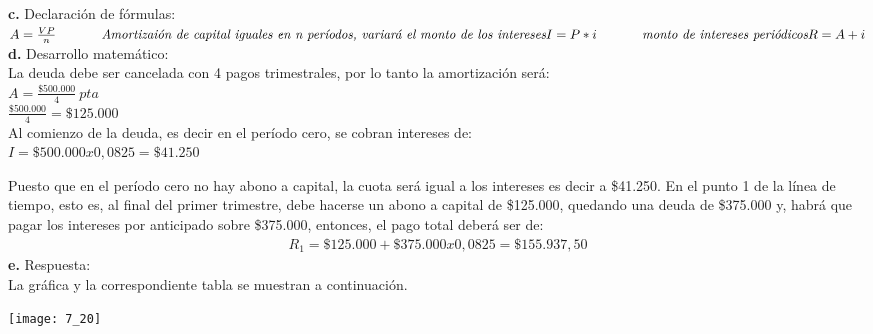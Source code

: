 \textbf{c.}	Declaración de fórmulas:\\


	$A=\frac{VP}{n} \hspace{35 pt} \textit{Amortizaión de capital iguales en n períodos, variará el monto de los intereses}\\
	I = P*i \hspace{35 pt} \textit{monto de intereses periódicos}\\
	R = A + i$\\


\textbf{d.}	Desarrollo matemático:\\


La deuda debe ser cancelada con 4 pagos trimestrales, por lo tanto la amortización será:\\


$	A = \frac{\$ 500.000}{4}\ pta$\\

	$\frac{\$ 500.000}{4}=\$ 125.000$\\
	

Al comienzo de la deuda, es decir en el período cero, se cobran intereses de:\\


$	I = \$ 500.000 x 0,0825=\$ 41.250$

Puesto que en el período cero no hay abono a capital, la cuota será igual a los intereses es decir a \$41.250. En el punto 1 de la línea de tiempo, esto es, al final del primer trimestre, debe hacerse un abono a capital de \$125.000, quedando una deuda de \$375.000 y, habrá que pagar los intereses por anticipado sobre \$375.000, entonces, el pago total deberá ser de:
\begin{align*}
	R_{1}=\$125.000 +\$375.000 x 0,0825= \$155. 937,50
\end{align*}
\textbf{e.}	Respuesta:\\
La gráfica y la correspondiente tabla se muestran a continuación.
\begin{center}
	\texttt{[image: 7\_20]}
\end{center}

